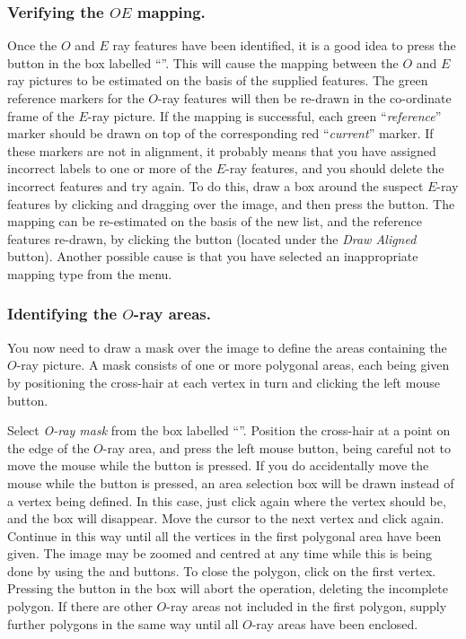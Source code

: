 \subsubsection {Verifying the $OE$ mapping.}
Once the $O$ and $E$ ray features have been identified, it is a good idea
to press the  button in
the box labelled ``''. This
will cause the mapping between the $O$ and $E$ ray pictures to be
estimated on the basis of the supplied features. The green reference
markers for the $O$-ray features will then be re-drawn in the co-ordinate
frame of the $E$-ray picture. If the mapping is successful, each green
``{\em reference}'' marker should be drawn on top of the corresponding
red ``{\em current}'' marker. If these markers are not in alignment, it
probably means that you have assigned incorrect labels to one or more of
the $E$-ray features, and you should delete the incorrect features and
try again. To do this, draw a box around the suspect $E$-ray features by
clicking and dragging over the image, and then press the  button. The mapping can be re-estimated on the
basis of the new list, and the reference features re-drawn, by clicking
the  button (located under the {\em
Draw Aligned} button). Another possible cause is that you have selected
an inappropriate mapping type from the  menu.

\subsubsection {Identifying the $O$-ray areas.}
You now need to draw a mask over the image to define the areas containing
the $O$-ray picture. A mask consists of one or more polygonal areas, each
being given by positioning the cross-hair at each vertex in turn and
clicking the left mouse button.

Select {\em O-ray mask} from the box labelled ``''. Position the cross-hair at a point on the
edge of the $O$-ray area, and press the left mouse button, being careful
not to move the mouse while the button is pressed. If you do accidentally
move the mouse while the button is pressed, an area selection box will be
drawn instead of a vertex being defined. In this case, just click again
where the vertex should be, and the box will disappear. Move the cursor
to the next vertex and click again. Continue in this way until all the
vertices in the first polygonal area have been given. The image may be
zoomed and centred at any time while this is being done by using the
 and 
buttons. To close the polygon, click on the first vertex. Pressing the
 button in the  box will abort the operation,
deleting the incomplete polygon. If there are other $O$-ray areas not
included in the first polygon, supply further polygons in the same way
until all $O$-ray areas have been enclosed.

